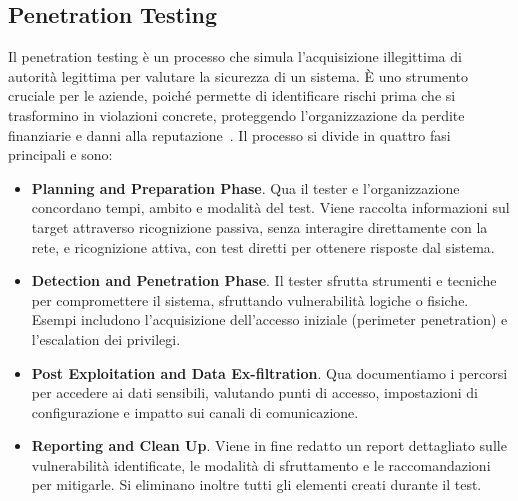     \subsection{Penetration Testing}
        Il penetration testing è un processo che simula l'acquisizione illegittima di autorità legittima per valutare la sicurezza di un sistema. È uno strumento cruciale per le aziende, poiché permette di identificare rischi prima che si trasformino in violazioni concrete, proteggendo l'organizzazione da perdite finanziarie e danni alla reputazione~\cite{pen_testing}. Il processo si divide in quattro fasi principali e sono:
        \begin{itemize}
            \item \textbf{Planning and Preparation Phase}. Qua il tester e l'organizzazione concordano tempi, ambito e modalità del test. Viene raccolta informazioni sul target attraverso ricognizione passiva, senza interagire direttamente con la rete, e ricognizione attiva, con test diretti per ottenere risposte dal sistema.
            \item \textbf{Detection and Penetration Phase}. Il tester sfrutta strumenti e tecniche per compromettere il sistema, sfruttando vulnerabilità logiche o fisiche. Esempi includono l'acquisizione dell'accesso iniziale (perimeter penetration) e l'escalation dei privilegi.
            \item \textbf{Post Exploitation and Data Ex-filtration}. Qua documentiamo i percorsi per accedere ai dati sensibili, valutando punti di accesso, impostazioni di configurazione e impatto sui canali di comunicazione.
            \item \textbf{Reporting and Clean Up}. Viene in fine redatto un report dettagliato sulle vulnerabilità identificate, le modalità di sfruttamento e le raccomandazioni per mitigarle. Si eliminano inoltre tutti gli elementi creati durante il test.
        \end{itemize}

